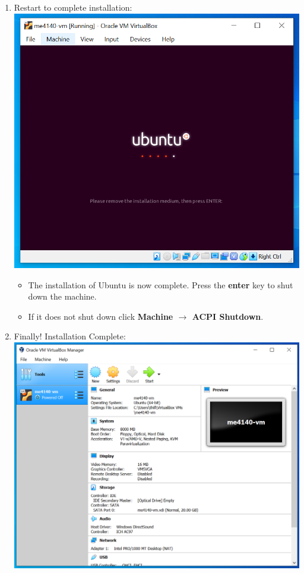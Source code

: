\documentclass[12pt]{article}
\begin{document}
\begin{description}
\begin{description}
\begin{enumerate}[label=\alph*)]
\item Restart to complete installation: \vspace{5mm} \\
      		\includegraphics[scale=.55]{Capture22.png}
      		 \begin{itemize}
        	\item The installation of Ubuntu is now complete. Press the {\bf enter} key to shut down the machine. 
        	\item If it does not shut down click {\bf Machine $\rightarrow $ ACPI Shutdown}. 
    		\end{itemize}  
  \vspace{5mm}   		
    		\item Finally! Installation Complete: \vspace{5mm} \\
      		\includegraphics[scale=.55]{CaptureY.png}

\end{enumerate}
\end{description}
\end{description}
\end{document}
